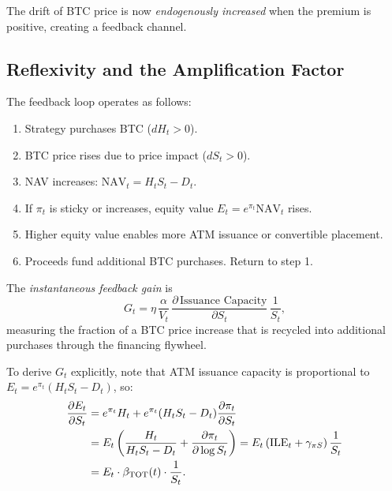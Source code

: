 The drift of BTC price is now \emph{endogenously increased} when
the premium is positive, creating a feedback channel.

\subsection{Reflexivity and the Amplification Factor}

The feedback loop operates as follows:
\begin{enumerate}
  \item Strategy purchases BTC ($dH_t > 0$).
  \item BTC price rises due to price impact ($dS_t > 0$).
  \item NAV increases: $\mathrm{NAV}_t = H_t S_t - D_t$.
  \item If $\pi_t$ is sticky or increases, equity value $E_t = e^{\pi_t}\mathrm{NAV}_t$ rises.
  \item Higher equity value enables more ATM issuance or convertible placement.
  \item Proceeds fund additional BTC purchases. Return to step 1.
\end{enumerate}

\begin{definition}
\label{def:feedback_gain_mi}
The \emph{instantaneous feedback gain} is
\begin{equation}
  G_t = \eta\,\frac{\alpha}{V_t}\,
  \frac{\partial\,\text{Issuance Capacity}}{\partial S_t}\,
  \frac{1}{S_t},
  \label{eq:feedback_gain_mi}
\end{equation}
measuring the fraction of a BTC price increase that is recycled
into additional purchases through the financing flywheel.
\end{definition}

To derive $G_t$ explicitly, note that ATM issuance capacity is
proportional to $E_t = e^{\pi_t}(H_t S_t - D_t)$, so:
\begin{align}
  \frac{\partial E_t}{\partial S_t}
  &= e^{\pi_t} H_t + e^{\pi_t}(H_t S_t - D_t)\frac{\partial\pi_t}{\partial S_t}
  \notag\\
  &= E_t\left(\frac{H_t}{H_t S_t - D_t}
    + \frac{\partial\pi_t}{\partial\log S_t}\right)
  = E_t\left(\mathrm{ILE}_t + \gamma_{\pi S}\right)\frac{1}{S_t}
  \notag\\
  &= E_t \cdot \beta_{\mathrm{TOT}}(t) \cdot \frac{1}{S_t}.
  \label{eq:equity_sensitivity}
\end{align}

